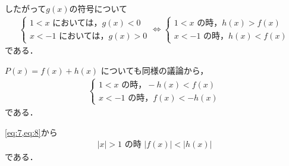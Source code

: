 \documentclass[../../main.tex]{subfiles}
\begin{document}
したがって$g(x)$の符号について
\begin{align}
  \begin{cases}
    1 < x  \text{ においては}，g(x) < 0 \\
    x < -1 \text{ においては}，g(x) > 0
  \end{cases}
  \iff
  \begin{cases}
    1 < x \text{ の時}，h(x) > f(x) \\
    x < -1 \text{ の時}，h(x) < f(x)
  \end{cases} \label{eq:7}
\end{align}
である．

$P(x) = f(x) + h(x)$ についても同様の議論から，
\begin{align}
  \begin{cases}
    1 < x \text{ の時}，-h(x) < f(x) \\
    x < -1 \text{ の時}，f(x) < -h(x)
  \end{cases} \label{eq:8}
\end{align}
である．

\cref{eq:7,eq:8}から
\begin{align}
  |x| > 1 \text{ の時 } |f(x)| < |h(x)|
\end{align}
である．

\end{document}
